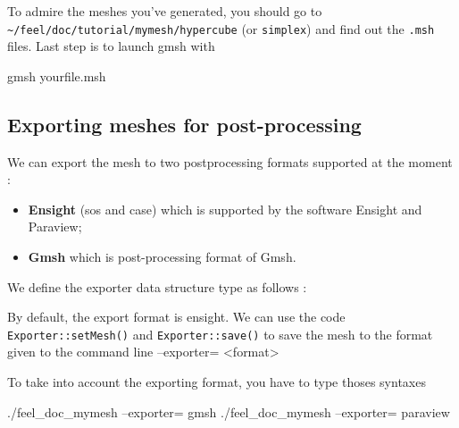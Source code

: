 To admire the meshes you've generated, you should go to \lstinline!~/feel/doc/tutorial/mymesh/hypercube! (or \lstinline!simplex!) and find out the \verb|.msh| files. Last step is to launch gmsh with 
\begin{unixcom}
		gmsh yourfile.msh
\end{unixcom} 

\subsection{Exporting meshes for post-processing}

We can export the mesh to two postprocessing formats supported at the moment :
\begin{itemize}
\item \textbf{Ensight} (sos and case)  which is supported by the software Ensight and Paraview;
\item \textbf{Gmsh} which is post-processing format of Gmsh.
\end{itemize}

We define the exporter data structure type as follows :


By default, the  export format is ensight. We can use the code \lstinline!Exporter::setMesh()! and \lstinline!Exporter::save()! to save the mesh to the format given to the command line --exporter= <format>



To take into account the exporting format, you have to type thoses syntaxes
\begin{unixcom}
		./feel_doc_mymesh  --exporter= gmsh
		./feel_doc_mymesh  --exporter= paraview
\end{unixcom}



